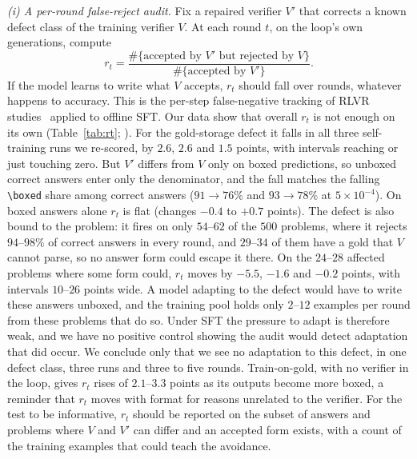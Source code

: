 \documentclass[runningheads]{llncs}
\begin{document}
\emph{(i) A per-round false-reject audit.} Fix a repaired verifier $V'$ that
corrects a known defect class of the training verifier $V$. At each round $t$,
on the loop's own generations, compute
\[
r_t = \frac{\#\{\text{accepted by } V' \text{ but rejected by } V\}}{\#\{\text{accepted by } V'\}} .
\]
If the model learns to write what $V$ accepts, $r_t$ should fall over rounds,
whatever happens to accuracy. This is the per-step false-negative tracking of
RLVR studies~\cite{ref_delayplateau,ref_tinyv} applied to offline SFT. Our
data show that overall $r_t$ is not enough on its own
(Table~\ref{tab:rt}; ). For
the gold-storage defect it falls in all three self-training runs we re-scored,
by $2.6$, $2.6$ and $1.5$ points, with intervals reaching or just touching
zero. But $V'$ differs from $V$ only on boxed predictions, so unboxed correct
answers enter only the denominator, and the fall matches the falling
\verb|\boxed| share among correct answers ($91\to76\%$ and $93\to78\%$ at
$5\times10^{-4}$). On boxed answers alone $r_t$ is flat (changes $-0.4$ to
$+0.7$ points). The defect is also bound to the problem: it fires on only
$54$--$62$ of the $500$ problems, where it rejects $94$--$98\%$ of correct
answers in every round, and $29$--$34$ of them have a gold that $V$ cannot
parse, so no answer form could escape it there. On the $24$--$28$ affected
problems where some form could, $r_t$ moves by $-5.5$, $-1.6$ and $-0.2$
points, with intervals $10$--$26$ points wide. A model adapting to the
defect would have to write these answers unboxed, and the training pool
holds only $2$--$12$ examples per round from these problems that do so. Under
SFT the pressure to adapt is therefore weak, and we have no positive control
showing the audit would detect adaptation that did occur. We conclude only
that we see no adaptation to this defect, in one defect class, three runs
and three to five rounds. Train-on-gold, with no verifier in the loop, gives
$r_t$ rises of $2.1$--$3.3$ points as its outputs become more boxed, a
reminder that $r_t$ moves with format for reasons unrelated to the verifier.
For the test to be informative, $r_t$ should be reported on the subset of
answers and problems where $V$ and $V'$ can differ and an accepted form
exists, with a count of the training examples that could teach the
avoidance.
\end{document}
